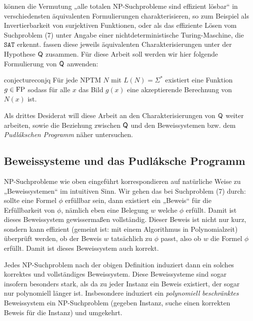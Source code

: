 \textcite{fenner_inverting_2003} können die Vermutung „alle totalen NP-Suchprobleme sind effizient lösbar“ in verschiedensten äquivalenten Formulierungen charakterisieren, so zum Beispiel als Invertierbarkeit von surjektiven Funktionen, oder als das effiziente Lösen vom Suchproblem (7) unter Angabe einer nichtdeterministische Turing-Maschine, die $\mathtt{SAT}$ erkennt.
\citeauthor{fenner_inverting_2003} fassen diese jeweils äquivalenten Charakterisierungen unter der Hypothese $\mathsf{Q}$ zusammen. Für diese Arbeit soll werden wir hier folgende Formulierung von  $\mathsf{Q}$ anwenden:
\begin{restatable}{conjecture}{conjq}
    Für jede NPTM $N$ mit $L(N)=\Sigma^*$ existiert eine Funktion $g\in\mathrm{FP}$ sodass für alle $x$ das Bild $g(x)$ eine akzeptierende Berechnung von $N(x)$ ist. 
\end{restatable}
Als drittes Desiderat will diese Arbeit an den Charakterisierungen von $\mathsf{Q}$ weiter arbeiten, sowie die Beziehung zwischen $\mathsf{Q}$ und den Beweissystemen \parencite[nach][]{cook_relative_1979} bzw. dem \emph{Pudlákschen Programm} \parencite*{pudlak_incompleteness_2017} näher untersuchen.


\subsection*{Beweissysteme und das Pudláksche Programm}

NP-Suchprobleme wie oben eingeführt korrespondieren auf natürliche Weise zu „Beweissystemen“ im intuitiven Sinn. Wir gehen das bei Suchproblem (7) durch: sollte eine Formel $\phi$ erfüllbar sein, dann existiert ein „Beweis“ für die Erfüllbarkeit von $\phi$, nämlich eben eine Belegung $w$ welche $\phi$ erfüllt. Damit ist dieses Beweissystem gewissermaßen vollständig.
Dieser Beweis ist nicht nur kurz, sondern kann effizient (gemeint ist: mit einem Algorithmus in Polynomialzeit) überprüft werden, ob der Beweis $w$ tatsächlich zu $\phi$ passt, also ob $w$ die Formel $\phi$ erfüllt. Damit ist dieses Beweissystem auch korrekt.

Jedes NP-Suchproblem nach der obigen Definition induziert dann ein solches korrektes und vollständiges Beweissystem. Diese Beweissysteme sind sogar insofern besonders stark, als da zu jeder Instanz ein Beweis existiert, der sogar nur polynomiell länger ist.
Insbesondere induziert ein \emph{polynomiell beschränktes} Beweissystem ein NP-Suchproblem (gegeben Instanz, suche einen korrekten Beweis für die Instanz) und umgekehrt.

